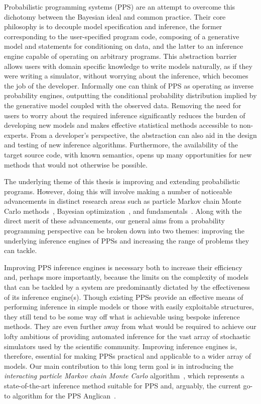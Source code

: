 Probabilistic programming systems (PPS) \citep{goodman2008church} are an attempt to
overcome this dichotomy between the Bayesian ideal and common practice.  Their core philosophy 
is to decouple model specification and inference, the former corresponding to the user-specified 
program code, composing of a generative model and statements for conditioning on data, and the 
latter to an inference engine capable of operating on arbitrary programs.  This abstraction barrier 
allows users with domain specific knowledge to write models naturally, as if they were writing a 
simulator, without worrying about the inference, which becomes the job of the developer. Informally 
one can think of PPS as operating as inverse probability engines, outputting the conditional 
probability distribution implied by the generative model coupled with the observed data.
Removing the need for users to worry about the required inference significantly reduces the 
burden of developing new models and makes effective statistical methods accessible to 
non-experts.  From a developer's perspective, the abstraction can also aid in the design 
and testing of new inference algorithms.  Furthermore, the availability of the target source 
code, with known semantics, opens up many opportunities for new methods that would
not otherwise be possible.

The underlying theme of this thesis is improving and extending probabilistic programs.  However,
doing this will involve making a number of noticeable advancements in  distinct research areas such
as particle Markov chain Monte Carlo methods~\citep{andrieu2010particle},
Bayesian optimization~\citep{movckus1975bayesian}, and \mc
fundamentals~\citep{metropolis1949monte}.  Along with the direct merit of
these advancements, our general aims from a probability programming perspective can be
broken down into two themes: improving the underlying inference engines of PPSs and increasing the
range of problems they can tackle.

Improving PPS inference engines is necessary both to increase their efficiency and,
perhaps more importantly, because the limits on the
complexity of models that can be tackled by a system are predominantly dictated by the 
effectiveness of its inference engine(s).  
 Though existing PPSs provide an effective means of performing
inference in simple models or those with easily exploitable structures, they still tend to be
some way off what is achievable using bespoke inference methods.  They are even further away from
what would be required to achieve our lofty ambitious of providing automated inference for
the vast array of stochastic simulators used by the scientific community.  
Improving inference engines is, therefore, essential for making PPSs practical and applicable 
to a wider array of models.
Our main contribution
to this long term goal is in introducing the \emph{interacting particle Markov chain Monte Carlo}
algorithm~\citep{rainforth2016interacting}, which represents a state-of-the-art inference method
suitable for PPS and, arguably, the current go-to algorithm for the PPS Anglican~\citep{wood2014new}.

